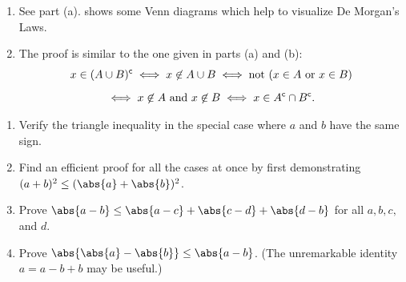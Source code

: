 \documentclass{lew98_solutions}
\begin{document}
\begin{solution}
\begin{enumerate}
        \item See part (a).  shows some Venn diagrams which help to visualize De Morgan's Laws.

        \item The proof is similar to the one given in parts (a) and (b):
        \begin{multline*}
            x \in (A \cup B)^{\mathsf{c}} \iff x \not\in A \cup B \iff \text{not } (x \in A \text{ or } x \in B) \\[2mm]
            \iff x \not\in A \text{ and } x \not\in B \iff x \in A^{\mathsf{c}} \cap B^{\mathsf{c}}.
        \end{multline*}
    \end{enumerate}
\end{solution}

\begin{exercise}
\label{ex:1.2.6}
    \begin{enumerate}
        \item Verify the triangle inequality in the special case where \( a \) and \( b \) have the same sign.

        \item Find an efficient proof for all the cases at once by first demonstrating \( (a + b)^2 \leq (\abs{a} + \abs{b})^2 \).

        \item Prove \( \abs{a - b} \leq \abs{a - c} + \abs{c - d} + \abs{d - b} \) for all \( a, b, c, \) and \( d \).

        \item Prove \( \abs{\abs{a} - \abs{b}} \leq \abs{a - b} \). (The unremarkable identity \( a = a - b + b \) may be useful.)
    \end{enumerate}
\end{exercise}
\end{document}
